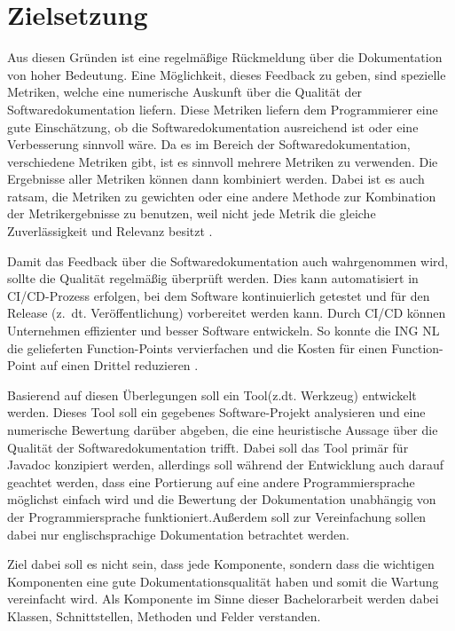 \section{Zielsetzung}
Aus diesen Gründen ist eine regelmäßige Rückmeldung über die Dokumentation von hoher Bedeutung. Eine Möglichkeit, dieses Feedback zu geben, sind spezielle Metriken, welche eine numerische Auskunft über die Qualität der Softwaredokumentation liefern. Diese Metriken liefern dem Programmierer eine gute Einschätzung, ob die Softwaredokumentation ausreichend ist oder eine Verbesserung sinnvoll wäre. Da es im Bereich der Softwaredokumentation, verschiedene Metriken gibt, ist es sinnvoll mehrere Metriken zu verwenden. Die Ergebnisse aller Metriken können dann kombiniert werden. Dabei ist es auch ratsam, die Metriken zu gewichten oder eine andere Methode zur Kombination der Metrikergebnisse zu benutzen, weil nicht jede Metrik die gleiche Zuverlässigkeit und Relevanz besitzt \cite[S. 1117ff.]{Softwarequalitymetricsaggregationinindustry}.

Damit das Feedback über die Softwaredokumentation auch wahrgenommen wird, sollte die Qualität regelmäßig  überprüft werden. Dies kann automatisiert in \ac{CI/CD}-Prozess erfolgen, bei dem Software kontinuierlich getestet und für den Release (z.~dt. Veröffentlichung) vorbereitet werden kann. Durch CI/CD können Unternehmen effizienter und besser Software entwickeln. So konnte die ING NL die gelieferten Function-Points vervierfachen und die Kosten für einen Function-Point auf einen Drittel reduzieren \cite[S. 520]{Vassallo2016}.

Basierend auf diesen Überlegungen soll ein Tool(z.dt. Werkzeug) entwickelt werden. Dieses Tool soll ein gegebenes Software-Projekt analysieren und eine numerische Bewertung darüber abgeben, die eine heuristische Aussage über die Qualität der Softwaredokumentation trifft.  Dabei soll das Tool primär für Javadoc konzipiert werden, allerdings soll während der Entwicklung auch darauf geachtet werden, dass eine Portierung auf eine andere Programmiersprache möglichst einfach wird und die Bewertung der Dokumentation unabhängig von der Programmiersprache funktioniert.Außerdem soll zur Vereinfachung sollen dabei nur englischsprachige Dokumentation betrachtet werden.

Ziel dabei soll es nicht sein, dass jede Komponente, sondern dass die wichtigen Komponenten eine gute Dokumentationsqualität haben und somit die Wartung vereinfacht wird.  Als Komponente im Sinne dieser Bachelorarbeit werden dabei Klassen, Schnittstellen, Methoden und Felder verstanden. 



